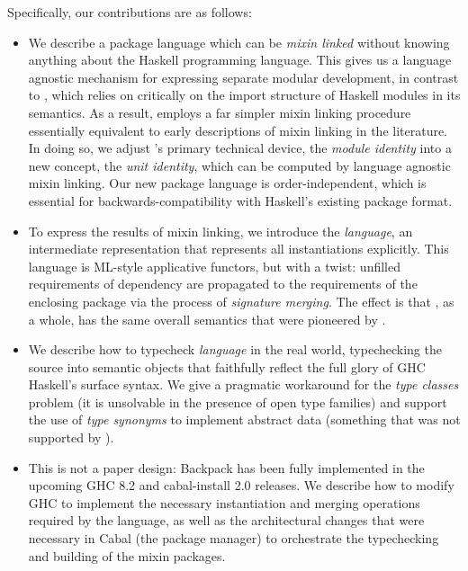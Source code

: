 Specifically, our contributions are as follows:
\begin{itemize}

    \item We describe a package language which can be \emph{mixin
    linked} without knowing anything about the Haskell programming
    language.  This gives us a language agnostic mechanism for
    expressing separate modular development, in contrast to
    \OldBackpack{}, which relies on critically on the import structure
    of Haskell modules in its semantics.  As a result, \Backpack{}
    employs a far simpler mixin linking procedure essentially equivalent
    to early descriptions of mixin linking in the literature.
    In doing so, we adjust \OldBackpack{}'s primary technical device,
    the \emph{module identity} into a new concept, the \emph{unit identity},
    which can be computed by language agnostic mixin linking.
    Our new package language is order-independent, which is
    essential for backwards-compatibility with Haskell's existing
    package format.

    \item To express the results of mixin linking, we introduce the
    \emph{\unit{} language}, an intermediate representation that
    represents all instantiations explicitly.  This language is
    ML-style applicative functors, but with a twist:
    unfilled requirements of dependency are propagated to the requirements
    of the enclosing package via the process of \emph{signature merging}.
    The effect is that \Backpack{}, as a whole, has the same overall
    semantics that were pioneered by \OldBackpack{}.

    \item We describe how to typecheck \emph{\unit{} language} in the
    real world, typechecking the source into semantic objects that
    faithfully reflect the full glory of GHC Haskell's surface syntax.
    We give a pragmatic workaround for the \emph{type classes} problem
    (it is unsolvable in the presence of open type families) and support
    the use of \emph{type synonyms} to implement abstract data
    (something that was not supported by \OldBackpack{}).

    \item This is not a paper design: Backpack has been fully
    implemented in the upcoming GHC 8.2 and cabal-install 2.0 releases.
    We describe how to modify GHC to
    implement the necessary instantiation and merging operations
    required by the \unit{} language, as well as the architectural
    changes that were necessary in Cabal (the package manager)
    to orchestrate the typechecking and building of the mixin
    packages.


\end{itemize}

